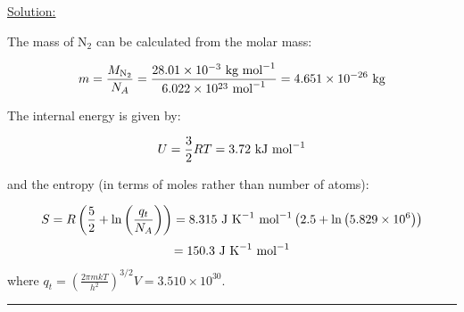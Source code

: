 \noindent
\underline{Solution:}

\noindent
The mass of N$_2$ can be calculated from the molar mass:

$$m = \frac{M_{\textnormal{N}_2}}{N_A} = \frac{28.01\times 10^{-3}\textnormal{ kg mol}^{-1}}{6.022\times 10^{23}\textnormal{ mol}^{-1}} = 4.651\times 10^{-26}\textnormal{ kg}$$ 

\noindent
The internal energy is given by:

$$U = \frac{3}{2}RT = 3.72\textnormal{ kJ mol}^{-1}$$

\noindent
and the entropy (in terms of moles rather than number of atoms):

$$S = R\left(\frac{5}{2} + \ln\left(\frac{q_t}{N_A}\right)\right) = 8.315\textnormal{ J K}^{-1}\textnormal{ mol}^{-1}\left(2.5 + \ln\left(5.829\times 10^6\right)\right)$$
$$= 150.3\textnormal{ J K}^{-1}\textnormal{ mol}^{-1}$$

\noindent
where $q_t = \left(\frac{2\pi mkT}{h^2}\right)^{3/2}V = 3.510\times 10^{30}$.

\hrule\vspace{0.5cm}
